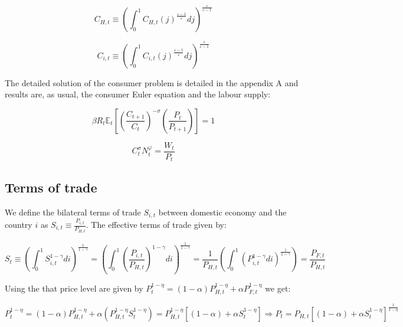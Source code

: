 \documentclass{article}
\newcommand{\Et}{\mathbb{E}_t}
\begin{document}
\begin{equation}
    C_{H,t} \equiv \left( \int^1_0 C_{H,t}(j)^{\frac{\varepsilon-1}{\varepsilon}} dj \right)^{\frac{\varepsilon}{\varepsilon-1}}
\end{equation}

\begin{equation}
    C_{i,t} \equiv \left( \int^1_0 C_{i,t}(j)^{\frac{\varepsilon-1}{\varepsilon}} dj \right)^{\frac{\varepsilon}{\varepsilon-1}}
\end{equation}


The detailed solution of the consumer problem is detailed in the appendix A and results are, as usual, the consumer Euler equation and the labour supply:

\begin{equation}
    \label{euler}
    \beta R_t \Et\left[\left(\frac{C_{t+1}}{C_t} \right)^{-\sigma} \left(\frac{P_t}{P_{t+1}} \right) \right] = 1
\end{equation}

\begin{equation}
    \label{labour_supply}
    C_t^\sigma N_t^\varphi = \frac{W_t}{P_t}
\end{equation}


\subsection{Terms of trade}
We define the bilateral terms of trade $S_{i,t}$ between domestic economy and the country $i$ as $S_{i,t} \equiv \frac{P_{i,t}}{P_{H,t}}$. The effective terms of trade given by:

\begin{equation}
    S_t \equiv \left(\int^1_0 S_{i,t}^{1-\gamma} di \right)^{\frac{1}{1-\gamma}} = \left(\int^1_0 \left(\frac{P_{i,t}}{P_{H,t}}  \right)^{1-\gamma}  di \right)^{\frac{1}{1-\gamma}} = \frac{1}{P_{H,t}} \left(\int^1_0 \left(P_{i,t}^{1-\gamma} di \right)^{\frac{1}{1-\gamma}}\right) = \frac{P_{F,t}}{P_{H,t}}
\end{equation}

Using the that price level are given by $P_t^{1-\eta} = (1-\alpha) P_{H,t}^{1-\eta} + \alpha P_{F,t}^{1-\eta}$ we get:

\begin{equation}
    \label{tot_level}
    P_t^{1-\eta} = (1-\alpha) P_{H,t}^{1-\eta} + \alpha \left( P_{H,t}^{1-\eta} S_{t}^{1-\eta} \right) = P_{H,t}^{1-\eta} \left[(1-\alpha) + \alpha S_t^{1-\eta} \right] \Rightarrow P_t = P_{H,t} \left[(1-\alpha) + \alpha S_t^{1-\eta} \right]^{\frac{1}{1-\eta}} 
\end{equation}
\end{document}
